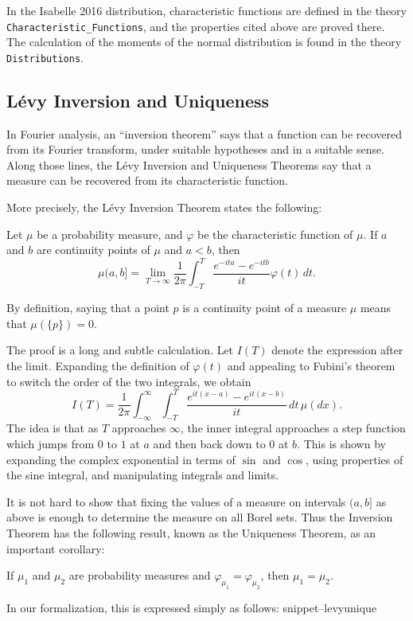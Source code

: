 \documentclass{svjour3}
\newcommand{\ph}{\varphi}
\newcommand{\Snippet}[1]{\csname snippet--#1\endcsname}
\begin{document}
In the Isabelle 2016 distribution, characteristic functions are defined in the theory \texttt{Characteristic\_Functions}, and the properties cited above are proved there. The calculation of the moments of the normal distribution is found in the theory \texttt{Distributions}.

\subsection{L\'evy Inversion and Uniqueness}

In Fourier analysis, an ``inversion theorem'' says that a function can be recovered from its Fourier transform, under suitable hypotheses and in a suitable sense. Along those lines, the L\'evy Inversion and Uniqueness Theorems say that a measure can be recovered from its characteristic function.

More precisely, the L\'evy Inversion Theorem states the following:
\begin{theorem}
Let $\mu$ be a probability measure, and $\ph$ be the characteristic function of $\mu$. If $a$ and $b$ are continuity points of $\mu$ and $a < b$, then
\[
\mu (a,b] = \lim_{T \rightarrow \infty} \frac{1}{2\pi} \int_{-T}^T \frac{e^{-ita} - e^{-itb}}{it} \ph(t) \, dt.
\]
\end{theorem}
By definition, saying that a point $p$ is a continuity point of a measure $\mu$ means that $\mu(\{p\}) = 0$.

The proof is a long and subtle calculation. Let $I(T)$ denote the expression after the limit. Expanding the definition of $\ph(t)$ and appealing to Fubini's theorem to switch the order of the two integrals, we obtain
\[
I(T) = \frac{1}{2\pi} \int_{-\infty}^\infty \int_{-T}^T \frac{e^{it(x-a)} - e^{it(x-b)}}{it} \, dt \, \mu(dx).
\]
The idea is that as $T$ approaches $\infty$, the inner integral approaches a step function which jumps from $0$ to $1$ at $a$ and then back down to $0$ at $b$. This is shown by expanding the complex exponential in terms of $\sin$ and $\cos$, using properties of the sine integral, and manipulating integrals and limits.

It is not hard to show that fixing the values of a measure on intervals $(a, b]$ as above is enough to determine the measure on all Borel sets. Thus the Inversion Theorem has the following result, known as the Uniqueness Theorem, as an important corollary:
\begin{theorem}
If $\mu_1$ and $\mu_2$ are probability measures and $\ph_{\mu_1} = \ph_{\mu_2}$, then $\mu_1 = \mu_2$.
\end{theorem}
In our formalization, this is expressed simply as follows:
\Snippet{levyunique}
\end{document}

